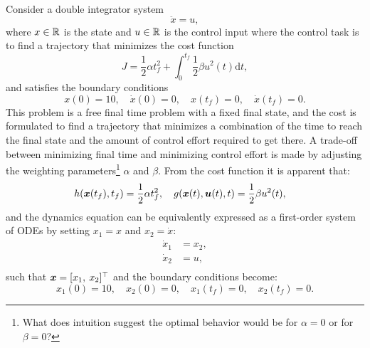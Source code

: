 \begin{example} \label{ex:ocp}
\theoremstyle{definition}
Consider a double integrator system
\begin{equation*}
    \ddot{x} = u,
\end{equation*}
where $x \in \mathbb{R}$ is the state and $u \in \mathbb{R}$ is the control input where the control task is to find a trajectory that minimizes the cost function
\begin{equation*}
J = \frac{1}{2}\alpha t_f^2 + \int_{0}^{t_f} \frac{1}{2}\beta u^2(t) \mathrm{d}t,
\end{equation*}
and satisfies the boundary conditions
\begin{equation*}
x(0) = 10,\quad \dot{x}(0) = 0,\quad x(t_f) = 0,\quad \dot{x}(t_f) = 0.
\end{equation*}
This problem is a free final time problem with a fixed final state, and the cost is formulated to find a trajectory that minimizes a combination of the time to reach the final state and the amount of control effort required to get there. A trade-off between minimizing final time and minimizing control effort is made by adjusting the weighting parameters\footnote{What does intuition suggest the optimal behavior would be for $\alpha = 0$ or for $\beta=0$?} $\alpha$ and $\beta$. From the cost function it is apparent that:
\begin{equation*}
\begin{split}
h(\bm{x}(t_f), t_f) &= \frac{1}{2}\alpha t_f^2, \quad g(\bm{x}(t), \bm{u}(t), t) = \frac{1}{2}\beta u^2(t), 
\end{split}
\end{equation*}
and the dynamics equation can be equivalently expressed as a first-order system of ODEs by setting $x_1 = x$ and $x_2 = \dot{x}$:
\begin{equation*}
\begin{split}
\dot{x}_1 &= x_2, \\
\dot{x}_2 &= u, \\
\end{split}
\end{equation*}
such that $\bm{x} = [x_1, \: x_2]^\top $ and the boundary conditions become:
\begin{equation*}
x_1(0) = 10, \quad x_2(0) = 0,\quad x_1(t_f) = 0,\quad x_2(t_f) = 0.
\end{equation*}


\end{example}
